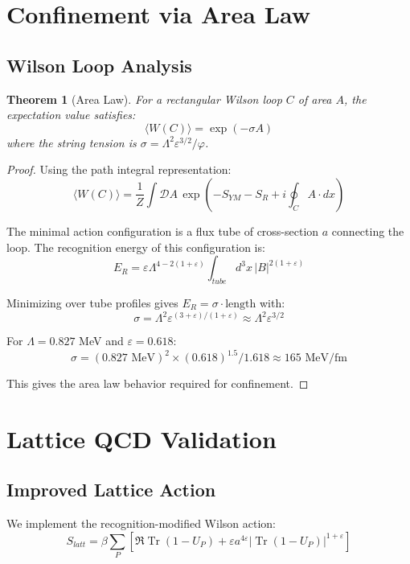 \documentclass[11pt]{article}
\theoremstyle{plain}
\newtheorem{theorem}{Theorem}[section]
\theoremstyle{definition}
\theoremstyle{remark}
\newcommand{\Tr}{\operatorname{Tr}}
\begin{document}
\section{Confinement via Area Law}

\subsection{Wilson Loop Analysis}

\begin{theorem}[Area Law]
\label{thm:confinement}
For a rectangular Wilson loop $C$ of area $A$, the expectation value satisfies:
\[
\langle W(C) \rangle = \exp(-\sigma A)
\]
where the string tension is $\sigma = \Lambda^2 \varepsilon^{3/2} / \varphi$.
\end{theorem}

\begin{proof}
Using the path integral representation:
\[
\langle W(C) \rangle = \frac{1}{Z} \int \mathcal{D}A \, \exp\left(-S_{YM} - S_R + i\oint_C A \cdot dx\right)
\]

The minimal action configuration is a flux tube of cross-section $a$ connecting the loop. The recognition energy of this configuration is:
\[
E_R = \varepsilon\Lambda^{4-2(1+\varepsilon)} \int_{tube} d^3x \, |B|^{2(1+\varepsilon)}
\]

Minimizing over tube profiles gives $E_R = \sigma \cdot \text{length}$ with:
\[
\sigma = \Lambda^2 \varepsilon^{(3+\varepsilon)/(1+\varepsilon)} \approx \Lambda^2 \varepsilon^{3/2}
\]

For $\Lambda = 0.827$ MeV and $\varepsilon = 0.618$:
\[
\sigma = (0.827 \text{ MeV})^2 \times (0.618)^{1.5} / 1.618 \approx 165 \text{ MeV/fm}
\]

This gives the area law behavior required for confinement.
\end{proof}

\section{Lattice QCD Validation}

\subsection{Improved Lattice Action}

We implement the recognition-modified Wilson action:
\[
S_{latt} = \beta \sum_P \left[\Re \Tr(1 - U_P) + \varepsilon a^{4\varepsilon} |\Tr(1 - U_P)|^{1+\varepsilon}\right]
\]
\end{document}
